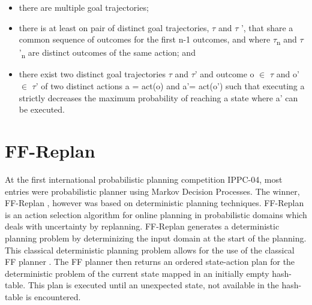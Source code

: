 \documentclass[runningheads,a4paper]{llncs}
\begin{document}
\begin{itemize}
	\item there are multiple goal trajectories;
	\item there is at least on pair of distinct goal trajectories, $\tau$ and $\tau$ ', that share a common sequence of outcomes for the first n-1 outcomes, and where $\tau$\textsubscript{n} and $\tau$'\textsubscript{n} are distinct outcomes of the same action; and
	\item there exist two distinct goal trajectories $\tau$ and $\tau$' and outcome o $\in$ $\tau$ and o' $\in$ $\tau$' of two distinct actions a = act(o) and a'= act(o') such that executing a strictly decreases the maximum probability of reaching a state where a' can be executed.
\end{itemize}

%



\section{FF-Replan}
\label{sec:planners}

At the first international probabilistic planning competition IPPC-04, most entries were probabilistic planner using Markov Decision Processes. The winner, FF-Replan \cite{FFReplan}, however was based on deterministic planning techniques. FF-Replan is an action selection algorithm for online planning in probabilistic domains which deals with uncertainty by replanning. FF-Replan generates a deterministic planning problem by determinizing the input domain at the start of the planning. This classical deterministic planning problem allows for the use of the classical FF planner \cite{Hoffmann01theff}. The FF planner then returns an ordered state-action plan for the deterministic problem of the current state mapped in an initially empty hash-table. This plan is executed until an unexpected state, not available in the hash-table is encountered. 
\end{document}
